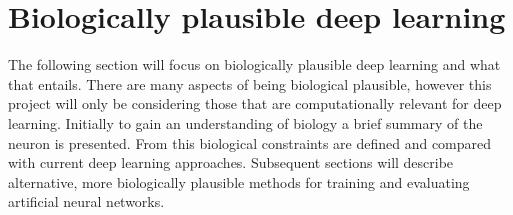 \documentclass[a4paper,11pt]{article} %
\begin{document}
\newpage

\section{Biologically plausible deep learning}
The following section will focus on biologically plausible deep learning and what that entails. There are many aspects of being biological plausible, however this project will only be considering those that are computationally relevant for deep learning. Initially to gain an understanding of biology a brief summary of the neuron is presented. From this biological constraints are defined and compared with current deep learning approaches. Subsequent sections will describe alternative, more biologically plausible methods for training and evaluating artificial neural networks. 
\end{document}
